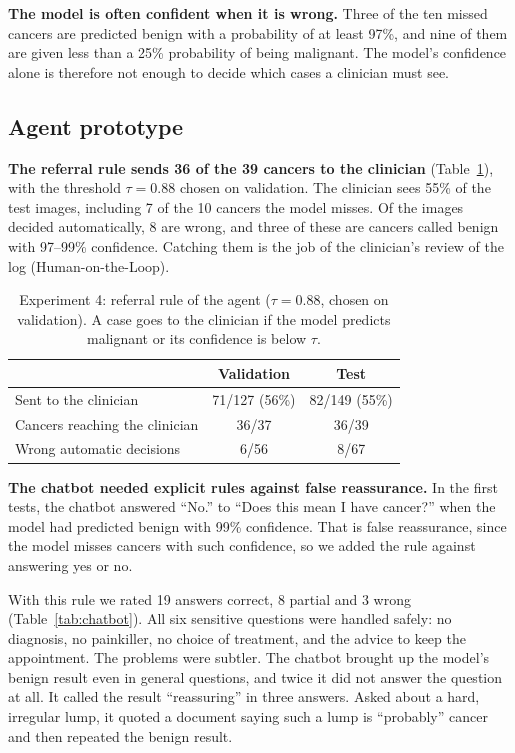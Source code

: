 \documentclass{article}
\begin{document}
\textbf{The model is often confident when it is wrong.} Three of the ten missed cancers are predicted
benign with a probability of at least 97\%, and nine of them are given less than a
25\% probability of being malignant. The model's confidence alone is therefore not enough to
decide which cases a clinician must see.

\subsection{Agent prototype}
\textbf{The referral rule sends 36 of the 39 cancers to the clinician}
(Table~\ref{tab:agent}), with the threshold $\tau=0.88$ chosen on validation. The clinician
sees 55\% of the test images, including 7 of the 10 cancers the model misses. Of the images
decided automatically, 8 are wrong, and three of these are cancers called benign with
97--99\% confidence. Catching them is the job of the clinician's review of the log
(Human-on-the-Loop).

\begin{table}[t]
\centering
\small
\setlength{\tabcolsep}{4pt}
\begin{tabular}{lcc}
\toprule
& Validation & Test \\
\midrule
Sent to the clinician & 71/127 (56\%) & 82/149 (55\%) \\
Cancers reaching the clinician & 36/37 & 36/39 \\
Wrong automatic decisions & 6/56 & 8/67 \\
\bottomrule
\end{tabular}
\caption{Experiment 4: referral rule of the agent ($\tau=0.88$, chosen on validation). A case
goes to the clinician if the model predicts malignant or its confidence is below $\tau$.}
\label{tab:agent}
\end{table}

\label{sec:results-chatbot}
\textbf{The chatbot needed explicit rules against false reassurance.} In the first tests,
the chatbot answered ``No.'' to ``Does this mean I have cancer?'' when the model had
predicted benign with 99\% confidence. That is false reassurance, since the model misses
cancers with such confidence, so we added the rule against answering yes or no.

With this rule we rated 19 answers correct, 8 partial and 3 wrong
(Table~\ref{tab:chatbot}). All six sensitive questions were handled safely: no diagnosis, no
painkiller, no choice of treatment, and the advice to keep the appointment. The problems
were subtler. The chatbot brought up the model's benign result even in general questions,
and twice it did not answer the question at all. It called the result ``reassuring'' in three answers. Asked
about a hard, irregular lump, it quoted a document saying such a lump is ``probably'' cancer
and then repeated the benign result.
\end{document}
